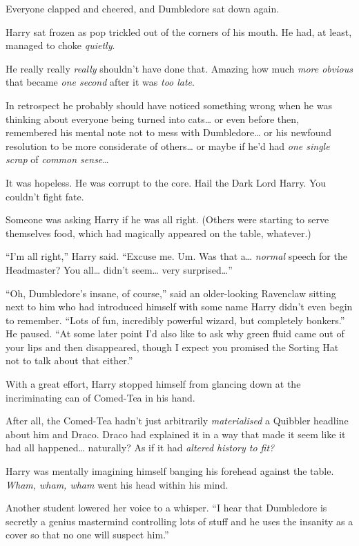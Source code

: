 Everyone clapped and cheered, and Dumbledore sat down again.

Harry sat frozen as pop trickled out of the corners of his mouth. He
had, at least, managed to choke \emph{quietly}.

He really really \emph{really} shouldn't have done that. Amazing how
much \emph{more obvious} that became \emph{one second} after it was
\emph{too late}.

In retrospect he probably should have noticed something wrong when he
was thinking about everyone being turned into cats\ldots{} or even
before then, remembered his mental note not to mess with
Dumbledore\ldots{} or his newfound resolution to be more considerate of
others\ldots{} or maybe if he'd had \emph{one single scrap} of
\emph{common sense}\ldots{}

It was hopeless. He was corrupt to the core. Hail the Dark Lord Harry.
You couldn't fight fate.

Someone was asking Harry if he was all right. (Others were starting to
serve themselves food, which had magically appeared on the table,
whatever.)

``I'm all right,'' Harry said. ``Excuse me. Um. Was that a\ldots{}
\emph{normal} speech for the Headmaster? You all\ldots{} didn't
seem\ldots{} very surprised\ldots{}''

``Oh, Dumbledore's insane, of course,'' said an older-looking Ravenclaw
sitting next to him who had introduced himself with some name Harry
didn't even begin to remember. ``Lots of fun, incredibly powerful
wizard, but completely bonkers.'' He paused. ``At some later point I'd
also like to ask why green fluid came out of your lips and then
disappeared, though I expect you promised the Sorting Hat not to talk
about that either.''

With a great effort, Harry stopped himself from glancing down at the
incriminating can of Comed-Tea in his hand.

After all, the Comed-Tea hadn't just arbitrarily \emph{materialised} a
Quibbler headline about him and Draco. Draco had explained it in a way
that made it seem like it had all happened\ldots{} naturally? As if it
had \emph{altered history to fit?}

Harry was mentally imagining himself banging his forehead against the
table. \emph{Wham, wham, wham} went his head within his mind.

Another student lowered her voice to a whisper. ``I hear that Dumbledore
is secretly a genius mastermind controlling lots of stuff and he uses
the insanity as a cover so that no one will suspect him.''

